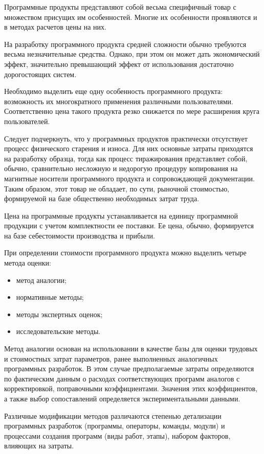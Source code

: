 \documentclass[utf8,usehyperref,12pt]{G7-32}
\begin{document}
Программные продукты представляют собой весьма специфичный товар с множеством присущих им особенностей. Многие их особенности проявляются и в методах расчетов цены на них.

 На разработку программного продукта средней сложности обычно требуются весьма незначительные средства. Однако, при этом он может дать экономический эффект, значительно превышающий эффект от использования достаточно дорогостоящих систем.
 
Необходимо выделить еще одну особенность программного продукта: возможность их многократного применения различными пользователями. Соответственно цена такого продукта резко снижается по мере расширения круга пользователей.

Следует подчеркнуть, что у программных продуктов практически отсутствует процесс физического старения и износа. Для них основные затраты приходятся на разработку образца, тогда как процесс тиражирования представляет собой, обычно, сравнительно несложную и недорогую процедуру копирования на магнитные носители программного продукта и сопровождающей документации. Таким образом, этот товар не обладает, по сути, рыночной стоимостью, формируемой на базе общественно необходимых затрат труда.

Цена на программные продукты устанавливается на единицу программной продукции с учетом комплектности ее поставки. Ее цена, обычно, формируется на базе себестоимости производства и прибыли.

При определении стоимости программного продукта можно выделить четыре метода оценки:
\begin{itemize}
 \item метод аналогии;
 \item нормативные методы;
 \item методы экспертных оценок;
 \item исследовательские методы.
\end{itemize}

Метод аналогии основан на использовании в качестве базы для оценки трудовых и стоимостных затрат параметров, ранее выполненных аналогичных программных разработок. В этом случае предполагаемые затраты определяются по фактическим данным о расходах соответствующих программ аналогов с корректировкой, поправочными коэффициентами. Значения этих коэффициентов, а также выбор сопоставлений определяется экспериментальными данными.

Различные модификации методов различаются степенью детализации программных разработок (программы, операторы, команды, модули) и процессами создания программ (виды работ, этапы), набором факторов, влияющих на затраты.
\end{document}

